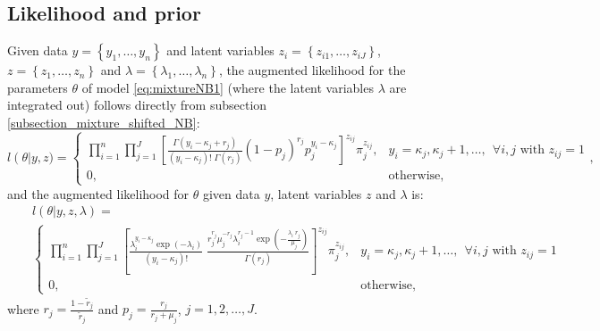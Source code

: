 \documentclass[11pt]{article}
\begin{document}
\subsection{Likelihood and prior}



Given data $y=\left\{y_1,\ldots,y_n\right\}$ and latent variables
$z_i=\left\{z_{i1},\ldots,z_{iJ}\right\}$,
$z = \left\{z_{1},\ldots,z_n\right\}$ and 
$\lambda = \left\{\lambda_{1},\ldots,\lambda_n\right\}$,
the augmented likelihood for the parameters $\theta$ of model \eqref{eq:mixtureNB1} (where the latent variables $\lambda$ are integrated out) follows directly from subsection \ref{subsection_mixture_shifted_NB}:
\begin{equation}
  l\left(\theta\right|y, z)
      =\left\{
            \begin{array}{ll}
              \prod_{i=1}^{n}\prod_{j=1}^{J}
                \left[
\frac{\Gamma(y_i-\kappa_j+r_j)}{(y_i-\kappa_j)! \; \Gamma(r_j)} (1-p_j)^{r_j} p_j^{y_i-\kappa_j}
                \right]^{z_{ij}}
                \pi_j^{z_{ij}},
                          & y_i = \kappa_j, \kappa_j + 1, \ldots, \:\: \forall i,j\mbox{ with }z_{ij}=1 \\
            0,  &\mbox{otherwise,}
            \end{array},
         \right.
\end{equation}
and the augmented likelihood for $\theta$ given data $y$, latent variables $z$ and $\lambda$ is:
\begin{eqnarray}
    & & l\left(\theta |y,z,\lambda\right) =  \\
      & & \left\{
            \begin{array}{ll}
              \prod_{i=1}^{n}\prod_{j=1}^{J}
                \left[
\frac{\lambda_i^{y_i-\kappa_j} \exp(-\lambda_i)}{(y_i-\kappa_j)!}  \; 
\frac{ r_j^{r_j} \mu_j^{-r_j} \lambda_i^{r_j-1} \exp \left(- \frac{\lambda_i \; r_j}{\mu_j}  \right)}{\Gamma(r_j)}
                \right]^{z_{ij}}
                \pi_j^{z_{ij}},
                          & y_i = \kappa_j, \kappa_j + 1, \ldots, \:\: \forall i,j\mbox{ with }z_{ij}=1 \\
            0,  &\mbox{otherwise,}
            \end{array}
         \right.  \nonumber
\end{eqnarray}
where $r_j = \frac{1 - \tilde r_j}{\tilde r_j}$ and
$p_j = \frac{r_j}{r_j+\mu_j}$, $j=1,2,\ldots,J$. 
\end{document}

